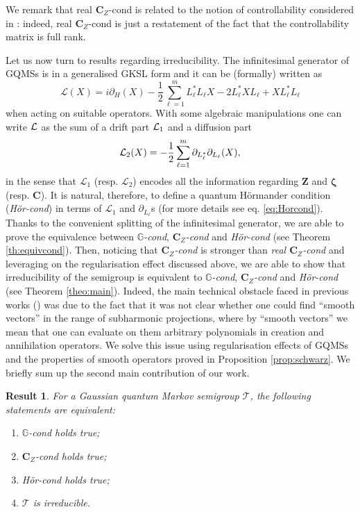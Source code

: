 \documentclass[preprint]{elsarticle}
\newtheorem{result}[defi]{Result}
\theoremstyle{definition}
\def\TT{\mathcal{T}}
\def\LL{\mathcal{L}}
\begin{document}
We remark that real $\mathbf{C}_Z$-cond is related to the notion of controllability considered in \cite{Ya14}: indeed, real $\mathbf{C}_Z$-cond is just a restatement of the fact that the controllability matrix is full rank.

Let us now turn to results regarding irreducibility. The infinitesimal generator of GQMSs is in a generalised GKSL form and it can be (formally) written as
$$\LL(X)=i\partial_H(X)-\frac{1}{2}\sum_{\ell=1}^{m}L_\ell^*L_\ell X -2L_\ell^* X L_\ell + X L_\ell^*L_\ell$$
when acting on suitable operators. With some algebraic manipulations one can write ${\cal L}$ as the sum of a drift part ${\cal L}_1$ and a diffusion part
$${\cal L}_2(X)=-\frac{1}{2}\sum_{\ell=1}^m\partial_{L_\ell^*}\partial_{L_\ell}(X),$$
in the sense that $\LL_1$ (resp. $\LL_2$) encodes all the information regarding $\mathbf{Z}$ and $\boldsymbol{\zeta}$ (resp. $\mathbf{C}$). It is natural, therefore, to define a quantum H\"ormander condition (\textit{H\"or-cond}) in terms of $\LL_1$ and $\partial_{L_\ell}$s (for more details see eq. \eqref{eq:Horcond}). Thanks to the convenient splitting of the infinitesimal generator, we are able to prove the equivalence between \textit{$\mathbb{G}$-cond}, \textit{$\textbf{C}_{Z}$-cond} and \textit{H\"or-cond} (see Theorem \ref{th:equivcond}). Then, noticing that \textit{$\textbf{C}_{Z}$-cond} is stronger than \textit{real $\textbf{C}_{Z}$-cond} and leveraging on the regularisation effect discussed above, we are able to show that irreducibility of the semigroup is equivalent to \textit{$\mathbb{G}$-cond}, \textit{$\textbf{C}_{Z}$-cond} and \textit{H\"or-cond} (see Theorem \ref{theo:main}). Indeed, the main technical obstacle faced in previous works (\cite{AFP22b,FP22}) was due to the fact that it was not clear whether one could find ``smooth vectors'' in the range of subharmonic projections, where by ``smooth vectors'' we mean that one can evaluate on them arbitrary polynomials in creation and annihilation operators. We solve this issue using regularisation effects of GQMSs and the properties of smooth operators proved in Proposition \ref{prop:schwarz}. We briefly sum up the second main contribution of our work.

\begin{result}
For a Gaussian quantum Markov semigroup $\TT$, the following statements are equivalent:
\begin{enumerate}
\item \textit{$\mathbb{G}$-cond} holds true;
\item \textit{$\textbf{C}_{Z}$-cond} holds true;
\item \textit{H\"or-cond} holds true;
\item $\TT$ is irreducible.
\end{enumerate}
\end{result}
\end{document}
